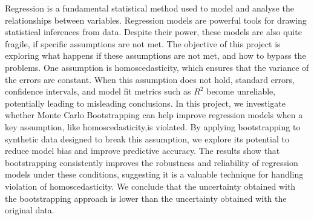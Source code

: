 Regression is a fundamental statistical method used to model and analyse the relationships between variables. Regression models are powerful tools for drawing statistical inferences from data. Despite their power, these models are also quite fragile, if specific assumptions are not met. The objective of this project is exploring what happens if these assumptions are not met, and how to bypass the problems. One assumption is homoscedasticity, which ensures that the variance of the errors are constant. When this assumption does not hold, standard errors, confidence intervals, and model fit metrics such as $R^2$ become unreliable, potentially leading to misleading conclusions. In this project, we investigate whether Monte Carlo Bootstrapping can help improve regression models when a key assumption, like homoscedasticity,is violated. By applying bootstrapping to synthetic data designed to break this assumption, we explore its potential to reduce model bias and improve predictive accuracy. The results show that bootstrapping consistently improves the robustness and reliability of regression models under these conditions, suggesting it is a valuable technique for handling  violation of homoscedasticity. We conclude that the uncertainty obtained with the bootstrapping approach is lower than the uncertainty obtained with the original data.